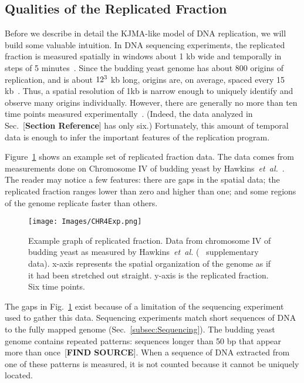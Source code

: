 	
		\subsection{Qualities of the Replicated Fraction}
		\label{subsec:QualitiesReplicatedFraction}
		
		Before we describe in detail the KJMA-like model of DNA replication, we will build some valuable intuition.
		In DNA sequencing experiments, the replicated fraction is measured spatially in windows about 1 kb wide and temporally in steps of 5 minutes~\cite{StochasticTermination}.
		Since the budding yeast genome has about 800 origins of replication, and is about $12\time10^3$ kb long, origins are, on average, spaced every 15 kb~\cite{OriDB,BuddingYeastSequence}.
		Thus, a spatial resolution of 1kb is narrow enough to uniquely identify and observe many origins individually. 
		However, there are generally no more than ten time points measured experimentally~\cite{StochasticTermination,DeepSeq,McCuneMicroArray}.
		(Indeed, the data analyzed in Sec.~[\textbf{Section Reference}] has only six.)
		Fortunately, this amount of temporal data is enough to infer the important features of the replication program.
		
		Figure~\ref{fig:ReplicatedFractionExample} shows an example set of replicated fraction data.
		The data comes from measurements done on Chromosome IV of budding yeast by Hawkins~\emph{et~al.}~\cite{StochasticTermination}.
		The reader may notice a few features:
		there are gaps in the spatial data;
		the replicated fraction ranges lower than zero and higher than one;
		and some regions of the genome replicate faster than others.
		
		\begin{figure}[tbh]
			\begin{center}
				\texttt{[image: Images/CHR4Exp.png]}
			\end{center}
				\caption[Budding yeast Chromosome IV replicated fraction]{\label{fig:ReplicatedFractionExample} Example graph of replicated fraction.
					Data from chromosome IV of budding yeast as measured by Hawkins~\emph{et~al.} (~\cite{StochasticTermination} supplementary data).
					x-axis represents the spatial organization of the genome as if it had been stretched out straight.
					y-axis is the replicated fraction.
					Six time points.
				}
		\end{figure}
		
		The gaps in Fig.~\ref{fig:ReplicatedFractionExample} exist because of a limitation of the sequencing experiment used to gather this data.
		Sequencing experiments match short sequences of DNA to the fully mapped genome (Sec.~\ref{subsec:Sequencing}).
		The budding yeast genome contains repeated patterns: sequences longer than 50 bp that appear more than once~[\textbf{FIND SOURCE}].
		When a sequence of DNA extracted from one of these patterns is measured, it is not counted because it cannot be uniquely located.
		
